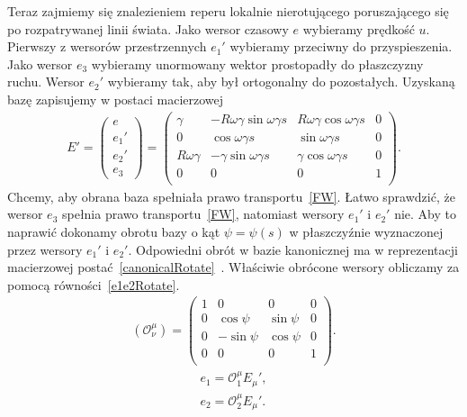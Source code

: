 Teraz zajmiemy się znalezieniem reperu lokalnie nierotującego
poruszającego się po rozpatrywanej linii świata.
Jako wersor czasowy $e$ wybieramy prędkość $u$. 
Pierwszy z wersorów przestrzennych $e_1'$ wybieramy 
przeciwny do przyspieszenia.
Jako wersor $e_3$ wybieramy unormowany wektor 
prostopadły do płaszczyzny ruchu.
Wersor $e_2'$ wybieramy tak, aby był ortogonalny do pozostałych. 
Uzyskaną bazę zapisujemy w postaci macierzowej
\begin{align}\label{Esimpleprim}
E'=
\begin{pmatrix}
e\\
e_1'\\
e_2'\\
e_3
\end{pmatrix}
=
\begin{pmatrix}
\gamma          & -R\omega\gamma\sin\omega\gamma s  
& R\omega\gamma\cos\omega\gamma s & 0 \\
0                   & \cos\omega\gamma s                   
&  \sin\omega\gamma s                & 0 \\
R\omega\gamma  & -\gamma\sin\omega\gamma    s           
& \gamma\cos\omega\gamma s           & 0 \\
0                   &   0                                           
& 0                                      & 1 \\
\end{pmatrix}.
\end{align}
Chcemy, aby obrana baza spełniała prawo transportu~\eqref{FW}. 
Łatwo sprawdzić, że wersor $e_3$ spełnia prawo 
transportu~\eqref{FW}, natomiast wersory $e_1'$ i $e_2'$ nie.
Aby to naprawić
dokonamy obrotu bazy o kąt $\psi=\psi(s)$ w płaszczyźnie wyznaczonej 
przez wersory $e_1'$ i $e_2'$. Odpowiedni obrót w bazie kanonicznej 
ma w reprezentacji macierzowej 
postać~\eqref{canonicalRotate}~\cite{star1993algebra}.
Właściwie obrócone wersory obliczamy za pomocą 
równości~\eqref{e1e2Rotate}.
\begin{align}\label{canonicalRotate}
( \mathcal{O}^\mu_\nu )
=
\begin{pmatrix}
1 & 0           & 0             & 0 \\
0 & \cos\psi    & \sin\psi  & 0 \\
0 & -\sin\psi   & \cos\psi  & 0 \\
0 & 0           &0          & 1 \\
\end{pmatrix}.
\end{align}
\begin{align}\label{e1e2Rotate}
e_1 =  \mathcal{O}^\mu_1 E_\mu ', \\
e_2 =  \mathcal{O}^\mu_2 E_\mu ' .\nonumber
\end{align}

